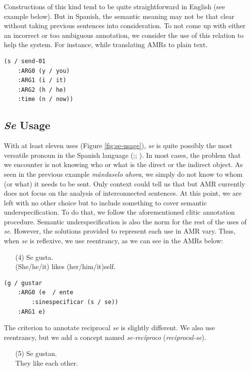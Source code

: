 \documentclass[10pt, a4paper]{article}
\begin{document}
Constructions of this kind tend to be quite straightforward in English (see example below). But in Spanish, the semantic meaning may not be that clear without taking previous sentences into consideration. To not come up with either an incorrect or too ambiguous annotation, we consider the use of this relation to help the system. For instance, while translating AMRs to plain text.

\begin{verbatim}
(s / send-01
    :ARG0 (y / you)
    :ARG1 (i / it)
    :ARG2 (h / he)
    :time (n / now))
\end{verbatim}

\subsection{\emph{Se} Usage}
{
With at least eleven uses (Figure \ref{fig:se-usage}), \emph{se} is quite possibly the most versatile pronoun in the Spanish language (\cite{lozanose};\cite{millanusose}; \cite{haywood2008thinking}). In most cases, the problem that we encounter is not knowing who or what is the direct or the indirect object. As seen in the previous example \emph{m\'andaselo ahora}, we simply do not know to whom (or what) it needs to be sent. Only context could tell us that but AMR currently does not focus on the analysis of interconnected sentences. At this point, we are left with no other choice but to include something to cover semantic underspecification. To do that, we follow the aforementioned clitic  annotation procedure. Semantic underspecification is also the norm for the rest of the uses of \emph{se}. However, the solutions provided to represent each use in AMR vary. Thus, when \emph{se} is reflexive, we use reentrancy, as we can see in the AMRs below:

\begin{enumerate}
\item[(4)]Se gusta.\\
(She/he/it) likes (her/him/it)self.
\end{enumerate}

\begin{verbatim}
(g / gustar
    :ARG0 (e  / ente
        :sinespecificar (s / se))
    :ARG1 e)
\end{verbatim}

The criterion to annotate reciprocal \emph{se} is slightly different. We also use reentrancy, but we add a concept named \emph{se-rec\'iproco} (\emph{reciprocal-se}).

\begin{enumerate}
\item[(5)]Se gustan.\\
They like each other.
\end{enumerate}

}
\end{document}
